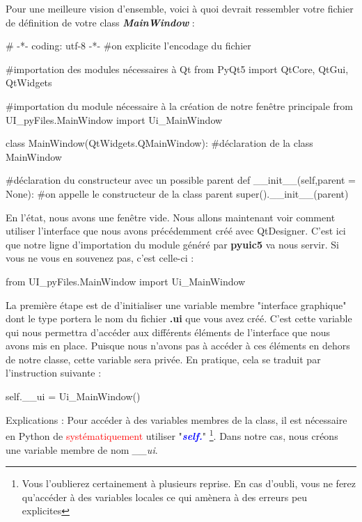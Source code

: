 \documentclass[12pt]{report}    %
\newcommand{\bold}[1]{{\bfseries #1}}
\newcommand{\italic}[1]{{\itshape #1}}
\newcommand{\ib}[1]{{\bfseries\itshape #1}}
\newcommand{\smallSkip}{\vskip 0.5cm}
\begin{document}


Pour une meilleure vision d'ensemble, voici à quoi devrait ressembler votre fichier de définition de votre class \ib{MainWindow} :
\begin{pyCode}
# -*- coding: utf-8 -*-
#on explicite l’encodage du fichier

#importation des modules nécessaires à Qt
from PyQt5 import QtCore, QtGui, QtWidgets

#importation du module nécessaire à la création de notre fenêtre principale
from UI_pyFiles.MainWindow import Ui_MainWindow

class MainWindow(QtWidgets.QMainWindow): #déclaration de la class MainWindow

	#déclaration du constructeur avec un possible parent
	def __init__(self,parent = None):
		#on appelle le constructeur de la class parent
		super().__init__(parent)
\end{pyCode}
\smallSkip
En l'état, nous avons une fenêtre vide. Nous allons maintenant voir comment utiliser l'interface que nous avons précédemment créé avec QtDesigner.\newline
C'est ici que notre ligne d'importation du module généré par \bold{pyuic5} va nous servir. Si vous ne vous en souvenez pas, c'est celle-ci :
\begin{pyCode}
from UI_pyFiles.MainWindow import Ui_MainWindow
\end{pyCode}
La première étape est de d'initialiser une variable membre "interface graphique" dont le type portera le nom du fichier \bold{*.ui} que vous avez créé.\newline
C'est cette variable qui nous permettra d'accéder aux différents éléments de l'interface que nous avons mis en place.\newline
Puisque nous n'avons pas à accéder à ces éléments en dehors de notre classe, cette variable sera privée.\newline
En pratique, cela se traduit par l'instruction suivante :
\begin{pyCode}
self.__ui = Ui_MainWindow()
\end{pyCode}
Explications : 
Pour accéder à des variables membres de la class, il est nécessaire en Python de \textcolor{red}{systématiquement} utiliser "\textcolor{blue}{\ib{self.}}"
\footnote{Vous l'oublierez certainement à plusieurs reprise. En cas d'oubli, vous ne ferez qu'accéder à des variables locales ce qui amènera à des erreurs peu explicites}. Dans notre cas, nous créons une variable membre de nom \italic{\_\_ui}.\newline
\end{document}
